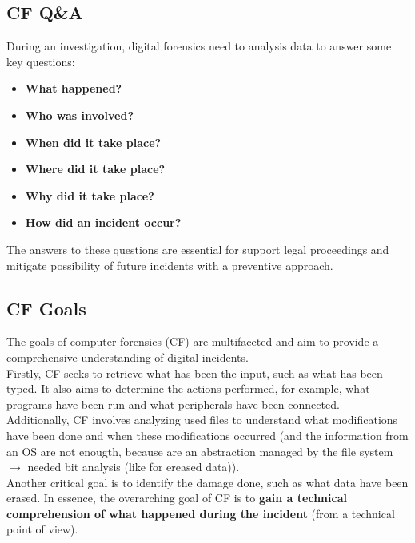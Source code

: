 \subsection{CF Q\&A}
During an investigation, digital forensics need to analysis data to answer some key questions: \\
\begin{minipage}[t]{0.45\textwidth}
  \begin{itemize}
    \item \textbf{What happened?}
    \item \textbf{Who was involved?}
    \item \textbf{When did it take place?}
  \end{itemize}
\end{minipage}
\begin{minipage}[t]{0.45\textwidth}
  \begin{itemize}
    \item \textbf{Where did it take place?}
    \item \textbf{Why did it take place?}
    \item \textbf{How did an incident occur?} \newline
  \end{itemize}
\end{minipage}

The answers to these questions are essential for support legal proceedings and mitigate
possibility of future incidents with a preventive approach.

\subsection{CF Goals}

The goals of computer forensics (CF) are multifaceted and aim to provide a
comprehensive understanding of digital incidents. \\
Firstly, CF seeks to retrieve what has been the input, such as what has been typed.
It also aims to determine the actions performed, for example, what programs have been run
and what peripherals have been connected. \\
Additionally, CF involves analyzing used files to understand what modifications
have been done and when these modifications occurred (and the information from an OS
  are not enougth, because are an abstraction managed by the file system $\rightarrow$ needed
bit analysis (like for ereased data)). \\
Another critical goal is to identify the damage done,
such as what data have been erased. In essence, the overarching goal
of CF is to \textbf{gain a technical comprehension of what happened during the
incident} (from a technical point of view).
